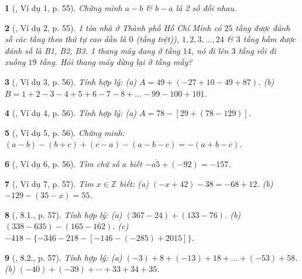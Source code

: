 \documentclass{article}
\newtheorem{baitoan}{}
\begin{document}
\begin{baitoan}[\cite{Binh_boi_duong_Toan_6_tap_1}, Ví dụ 1, p. 55]
	Chứng minh $a - b$ \& $b - a$ là 2 số đối nhau.
\end{baitoan}

\begin{baitoan}[\cite{Binh_boi_duong_Toan_6_tap_1}, Ví dụ 2, p. 55]
	1 tòa nhà ở Thành phố Hồ Chí Minh có $25$ tầng được đánh số các tầng theo thứ tự cao dần là $0$ (tầng trệt)), $1,2,3,\ldots,24$ \& $3$ tầng hầm được đánh số là B1, B2, B3. 1 thang máy đang ở tầng $14$, nó đi lên $3$ tầng rồi đi xuống $19$ tầng. Hỏi thang máy dừng lại ở tầng mấy?
\end{baitoan}

\begin{baitoan}[\cite{Binh_boi_duong_Toan_6_tap_1}, Ví dụ 3, p. 56]
	Tính hợp lý: (a) $A = 49 + (-27 + 10 - 49 + 87)$. (b) $B = 1 + 2 - 3 - 4 + 5 + 6 - 7 - 8 + \ldots - 99 - 100 + 101$.
\end{baitoan}

\begin{baitoan}[\cite{Binh_boi_duong_Toan_6_tap_1}, Ví dụ 4, p. 56]
	Tính hợp lý: (a) $A = 78 - [29 + (78 - 129)]$.
\end{baitoan}

\begin{baitoan}[\cite{Binh_boi_duong_Toan_6_tap_1}, Ví dụ 5, p. 56]
	Chứng minh: $(a - b) - (b + c) + (c - a) - (a - b - c) = -(a + b - c)$.
\end{baitoan}

\begin{baitoan}[\cite{Binh_boi_duong_Toan_6_tap_1}, Ví dụ 6, p. 56]
	Tìm chữ số $a$ biết $-\overline{a5} + (-92) = -157$.
\end{baitoan}

\begin{baitoan}[\cite{Binh_boi_duong_Toan_6_tap_1}, Ví dụ 7, p. 57]
	Tìm $x\in\mathbb{Z}$ biết: (a) $(-x + 42) - 38 = -68 + 12$. (b) $-129 - (35 - x) = 55$.
\end{baitoan}

\begin{baitoan}[\cite{Binh_boi_duong_Toan_6_tap_1}, 8.1., p. 57]
	Tính hợp lý: (a) $(367 - 24) + (133 - 76)$. (b) $(338 - 635) - (165 - 162)$. (c) $-418 - \{-346 - 218 - [-146 - (-285) + 2015]\}$.
\end{baitoan}

\begin{baitoan}[\cite{Binh_boi_duong_Toan_6_tap_1}, 8.2., p. 57]
	Tính hợp lý: (a) $(-3) + 8 + (-13) + 18 + \ldots + (-53) + 58$. (b) $(-40) + (-39) + \cdots + 33 + 34 + 35$.
\end{baitoan}
\end{document}
